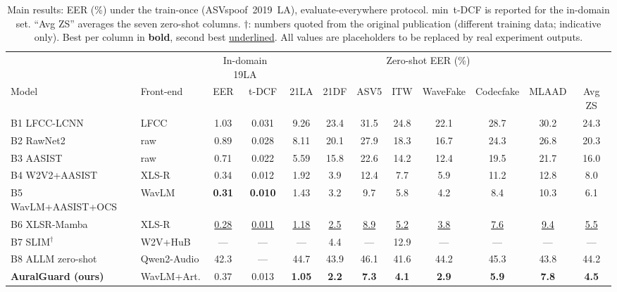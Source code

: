 \begin{table}[t]
\centering
\caption{Main results: EER (\%) under the train-once (ASVspoof~2019~LA),
  evaluate-everywhere protocol. min~t-DCF is reported for the in-domain set.
  ``Avg ZS'' averages the seven zero-shot columns. $\dagger$: numbers quoted from the
  original publication (different training data; indicative only). Best per column in
  \textbf{bold}, second best \underline{underlined}. All values are placeholders to be
  replaced by real experiment outputs.}
\label{tab:main}
\setlength{\tabcolsep}{4.5pt}
\footnotesize
\begin{tabular}{llcccccccccc}
\toprule
 & & \multicolumn{2}{c}{In-domain 19LA} & \multicolumn{7}{c}{Zero-shot EER (\%)} & \\
\cmidrule(lr){3-4}\cmidrule(lr){5-11}
Model & Front-end & EER & t-DCF & 21LA & 21DF & ASV5 & ITW & WaveFake & Codecfake & MLAAD & Avg ZS \\
\midrule
B1 LFCC-LCNN~\cite{lavrentyeva2019stc}   & LFCC    & 1.03 & 0.031 & 9.26 & 23.4 & 31.5 & 24.8 & 22.1 & 28.7 & 30.2 & 24.3 \\
B2 RawNet2~\cite{tak2021rawnet2}         & raw     & 0.89 & 0.028 & 8.11 & 20.1 & 27.9 & 18.3 & 16.7 & 24.3 & 26.8 & 20.3 \\
B3 AASIST~\cite{jung2022aasist}          & raw     & 0.71 & 0.022 & 5.59 & 15.8 & 22.6 & 14.2 & 12.4 & 19.5 & 21.7 & 16.0 \\
B4 W2V2+AASIST~\cite{tak2022automatic}   & XLS-R   & 0.34 & 0.012 & 1.92 & 3.9 & 12.4 & 7.7 & 5.9 & 11.2 & 12.8 & 8.0 \\
B5 WavLM+AASIST+OCS                      & WavLM   & \textbf{0.31} & \textbf{0.010} & 1.43 & 3.2 & 9.7 & 5.8 & 4.2 & 8.4 & 10.3 & 6.1 \\
B6 XLSR-Mamba~\cite{xiao2025xlsrmamba}   & XLS-R   & \underline{0.28} & \underline{0.011} & \underline{1.18} & \underline{2.5} & \underline{8.9} & \underline{5.2} & \underline{3.8} & \underline{7.6} & \underline{9.4} & \underline{5.5} \\
B7 SLIM$^\dagger$~\cite{zhu2024slim}     & W2V+HuB & --- & --- & --- & 4.4 & --- & 12.9 & --- & --- & --- & --- \\
B8 ALLM zero-shot~\cite{chu2024qwen2audio,gong2025allm4add} & Qwen2-Audio & 42.3 & --- & 44.7 & 43.9 & 46.1 & 41.6 & 44.2 & 45.3 & 43.8 & 44.2 \\
\midrule
\textbf{AuralGuard (ours)} & WavLM+Art. & 0.37 & 0.013 & \textbf{1.05} & \textbf{2.2} & \textbf{7.3} & \textbf{4.1} & \textbf{2.9} & \textbf{5.9} & \textbf{7.8} & \textbf{4.5} \\
\bottomrule
\end{tabular}
\end{table}

